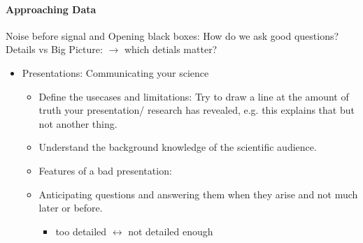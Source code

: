 \documentclass[../main.tex]{subfiles}
\begin{document}
\paragraph*{Approaching Data}
Noise before signal and Opening black boxes: How do we ask good questions? Details vs Big Picture:
$\to$ which detials matter?
\begin{itemize}
    \item Presentations: Communicating your science
    \begin{itemize}
        \item Define the usecases and limitations: Try to draw a line at the amount of truth your
        presentation/ research has revealed, e.g. this explains that but not another thing.
        \item Understand  the background knowledge of the scientific audience.
        \item Features of a bad presentation: 
        \item Anticipating questions and answering them when they arise and not much later or before.
        \begin{itemize}
            \item too detailed $\leftrightarrow$ not detailed enough
        \end{itemize}
    \end{itemize}
\end{itemize}
\end{document}

